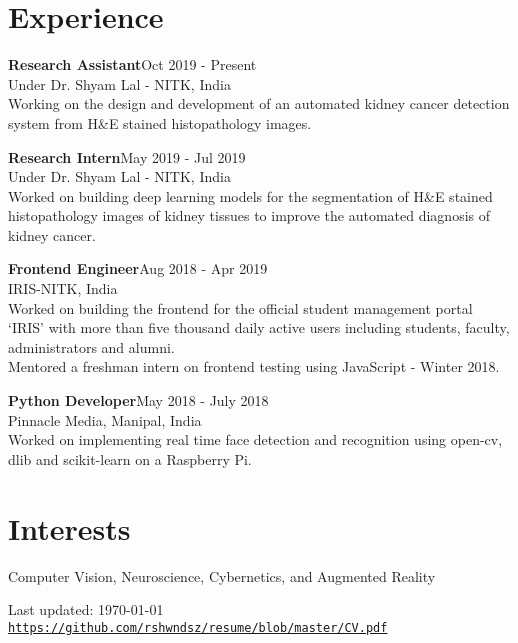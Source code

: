 \documentclass[letterpaper]{article}
\def\footerlink{https://github.com/rshwndsz/resume/blob/master/CV.pdf}
\renewenvironment{itemize}{
  \begin{list}{}{
    \setlength{\leftmargin}{1.5em}
  }
}{
  \end{list}
}
\begin{document}
\section*{Experience}
  \begin{itemize}
    \item \textbf{Research Assistant}\hfill{\textcolor{black!80}{\small{Oct 2019 - Present}}}\\
    \textcolor{black!80}{\small{Under Dr. Shyam Lal - NITK, India}}\\
    Working on the design and development of an automated kidney cancer detection system from H\&E stained histopathology images.

    \item \textbf{Research Intern}\hfill{\textcolor{black!80}{\small{May 2019 - Jul 2019}}}\\
    \textcolor{black!80}{\small{Under Dr. Shyam Lal - NITK, India}}\\
    Worked on building deep learning models for the segmentation of H\&E stained histopathology images of kidney tissues to improve the automated diagnosis of kidney cancer.

    \item \textbf{Frontend Engineer}\hfill{\textcolor{black!80}{\small{Aug 2018 - Apr 2019}}}\\
    \textcolor{black!80}{\small{IRIS-NITK, India}}\\
    Worked on building the frontend for the official student management portal `IRIS' with more than five thousand daily active users including students, faculty, administrators and alumni.\\
    Mentored a freshman intern on frontend testing using JavaScript - Winter 2018.

    \item \textbf{Python Developer}\hfill{\textcolor{black!80}{\small{May 2018 - July 2018}}}\\
    \textcolor{black!80}{\small{Pinnacle Media, Manipal, India}}\\
    Worked on implementing real time face detection and recognition using open-cv, dlib and scikit-learn on a Raspberry Pi.
  \end{itemize}


\section*{Interests}
  \begin{itemize}
    \item Computer Vision, Neuroscience, Cybernetics, and Augmented Reality
  \end{itemize}


\bigskip
\begin{center}
  \begin{footnotesize}
    Last updated: \today \\
    \href{\footerlink}{\texttt{\footerlink}}
  \end{footnotesize}
\end{center}
\end{document}
